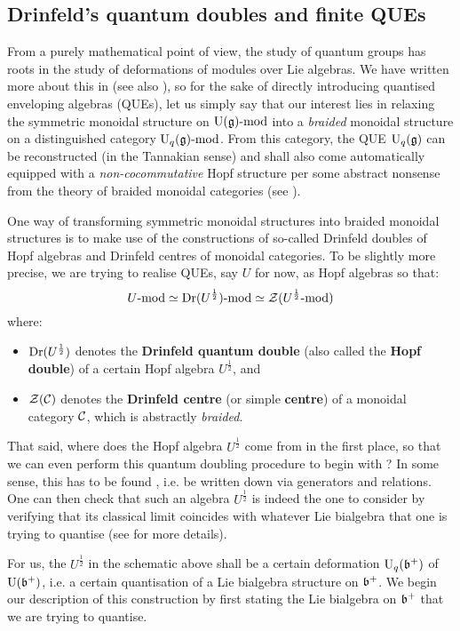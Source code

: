     \subsection{Drinfeld's quantum doubles and finite QUEs}
        From a purely mathematical point of view, the study of quantum groups has roots in the study of deformations of modules over Lie algebras. We have written more about this in \cite{quantum_double} (see also \cite{etingof_kazhdan_quantisation_1}), so for the sake of directly introducing quantised enveloping algebras (QUEs), let us simply say that our interest lies in relaxing the symmetric monoidal structure on $\mathrm{U}(\mathfrak{g})\text{-}\mathrm{mod}$ into a \textit{braided} monoidal structure on a distinguished category $\mathrm{U}_q(\mathfrak{g})\text{-}\mathrm{mod}$. From this category, the QUE $\mathrm{U}_q(\mathfrak{g})$ can be reconstructed (in the Tannakian sense) and shall also come automatically equipped with a \textit{non-cocommutative} Hopf structure per some abstract nonsense from the theory of braided monoidal categories (see \cite{EGNO}).

        One way of transforming symmetric monoidal structures into braided monoidal structures is to make use of the constructions of so-called Drinfeld doubles of Hopf algebras and Drinfeld centres of monoidal categories. To be slightly more precise, we are trying to realise QUEs, say $U$ for now, as Hopf algebras so that:
            $$U\text{-}\mathrm{mod} \simeq \mathrm{Dr}(U^{\frac12})\text{-}\mathrm{mod} \simeq \mathcal{Z}(U^{\frac12}\text{-}\mathrm{mod})$$
        where:
        \begin{itemize}
            \item $\mathrm{Dr}(U^{\frac12})$ denotes the \textbf{Drinfeld quantum double} (also called the \textbf{Hopf double}) of a certain Hopf algebra $U^{\frac12}$, and
            \item $\mathcal{Z}(\mathcal{C})$ denotes the \textbf{Drinfeld centre} (or simple \textbf{centre}) of a monoidal category $\mathcal{C}$, which is abstractly \textit{braided}.
        \end{itemize}
        That said, where does the Hopf algebra $U^{\frac12}$ come from in the first place, so that we can even perform this quantum doubling procedure to begin with ? In some sense, this has to be found , i.e. be written down via generators and relations. One can then check that such an algebra $U^{\frac12}$ is indeed the  one to consider by verifying that its classical limit coincides with whatever Lie bialgebra that one is trying to quantise (see \cite{etingof_kazhdan_quantisation_1} for more details).

        For us, the  $U^{\frac12}$ in the schematic above shall be a certain deformation $\mathrm{U}_q(\mathfrak{b}^+)$ of $\mathrm{U}(\mathfrak{b}^+)$, i.e. a certain quantisation of a Lie bialgebra structure on $\mathfrak{b}^+$. We begin our description of this construction by first stating the Lie bialgebra on $\mathfrak{b}^+$ that we are trying to quantise. 

